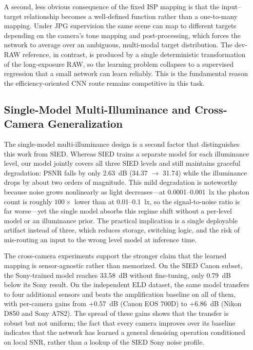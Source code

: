 \documentclass[remotesensing,article,accept,moreauthors]{Definitions/mdpi}
\begin{document}
A second, less obvious consequence of the fixed ISP mapping is that the input--target relationship becomes a well-defined function rather than a one-to-many mapping. Under JPG supervision the same scene can map to different targets depending on the camera's tone mapping and post-processing, which forces the network to average over an ambiguous, multi-modal target distribution. The dev-RAW reference, in contrast, is produced by a single deterministic transformation of the long-exposure RAW, so the learning problem collapses to a supervised regression that a small network can learn reliably. This is the fundamental reason the efficiency-oriented CNN route remains competitive in this task.

\subsection{Single-Model Multi-Illuminance and Cross-Camera Generalization}

The single-model multi-illuminance design is a second factor that distinguishes this work from SIED. Whereas SIED trains a separate model for each illuminance level, our model jointly covers all three SIED levels and still maintains graceful degradation: PSNR falls by only 2.63~dB (34.37 $\rightarrow$ 31.74) while the illuminance drops by about two orders of magnitude. This mild degradation is noteworthy because noise grows nonlinearly as light decreases---at 0.0001--0.001~lx the photon count is roughly $100\times$ lower than at 0.01--0.1~lx, so the signal-to-noise ratio is far worse---yet the single model absorbs this regime shift without a per-level model or an illuminance prior. The practical implication is a single deployable artifact instead of three, which reduces storage, switching logic, and the risk of mis-routing an input to the wrong level model at inference time.

The cross-camera experiments support the stronger claim that the learned mapping is sensor-agnostic rather than memorized. On the SIED Canon subset, the Sony-trained model reaches 33.58~dB without fine-tuning, only 0.79~dB below its Sony result. On the independent ELD dataset, the same model transfers to four additional sensors and beats the amplification baseline on all of them, with per-camera gains from $+0.57$~dB (Canon EOS 700D) to $+6.86$~dB (Nikon D850 and Sony A7S2). The spread of these gains shows that the transfer is robust but not uniform; the fact that every camera improves over its baseline indicates that the network has learned a general denoising operation conditioned on local SNR, rather than a lookup of the SIED Sony noise profile.
\end{document}
